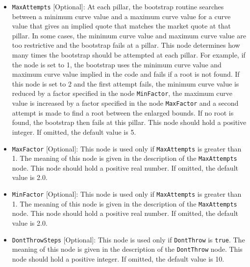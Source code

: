 \begin{itemize}
\item \lstinline!MaxAttempts! [Optional]:
At each pillar, the bootstrap routine searches between a minimum curve value and a maximum curve value for a curve value that gives an implied quote that matches the market quote at that pillar. In some cases, the minimum curve value and maximum curve value are too restrictive and the bootstrap fails at a pillar. This node determines how many times the bootstrap should be attempted at each pillar. For example, if the node is set to 1, the bootstrap uses the minimum curve value and maximum curve value implied in the code and fails if a root is not found. If this node is set to 2 and the first attempt fails, the minimum curve value is reduced by a factor specified in the node \lstinline!MinFactor!, the maximum curve value is increased by a factor specified in the node \lstinline!MaxFactor! and a second attempt is made to find a root between the enlarged bounds. If no root is found, the bootstrap then fails at this pillar. This node should hold a positive integer. If omitted, the default value is 5.

\item \lstinline!MaxFactor! [Optional]:
This node is used only if \lstinline!MaxAttempts! is greater than 1. The meaning of this node is given in the description of the \lstinline!MaxAttempts! node. This node should hold a positive real number. If omitted, the default value is 2.0.

\item \lstinline!MinFactor! [Optional]:
This node is used only if \lstinline!MaxAttempts! is greater than 1. The meaning of this node is given in the description of the \lstinline!MaxAttempts! node. This node should hold a positive real number. If omitted, the default value is 2.0.

\item \lstinline!DontThrowSteps! [Optional]:
This node is used only if \lstinline!DontThrow! is \lstinline!true!. The meaning of this node is given in the description of the \lstinline!DontThrow! node. This node should hold a positive integer. If omitted, the default value is 10.


\end{itemize}
